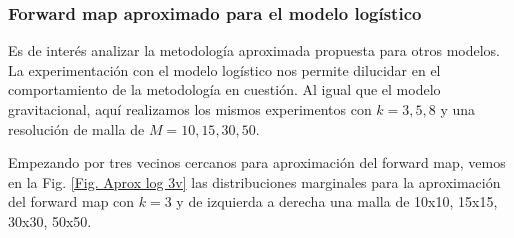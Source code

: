 
\subsubsection*{Forward map aproximado para el modelo logístico}

Es de interés analizar la metodología aproximada propuesta para otros modelos. La experimentación con el modelo logístico nos permite dilucidar en el comportamiento de la metodología en cuestión. Al igual que el modelo gravitacional, aquí realizamos los mismos experimentos con $k = 3,5,8$ y una resolución de malla de $M = 10, 15, 30, 50$.


Empezando por tres vecinos cercanos para aproximación del forward map, vemos en la Fig. \ref{Fig. Aprox log 3v} las distribuciones marginales para la aproximación del forward map con $k = 3$ y de izquierda a derecha una malla de 10x10, 15x15, 30x30, 50x50.

